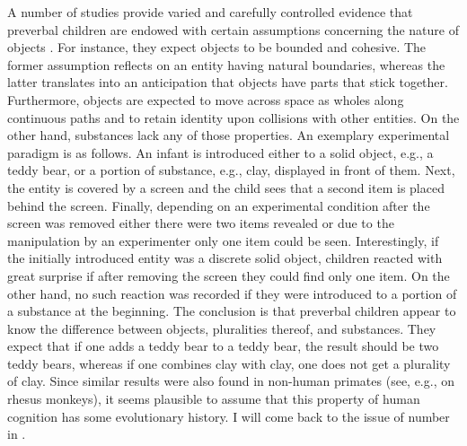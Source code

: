 A number of studies provide varied and carefully controlled evidence that preverbal children are endowed with certain assumptions concerning the nature of objects \citep[e.g.,][]{carey1985conceptual,spelke1990principles,soja_carey_spelke1991ontological,carey_spelke1996science}. For instance, they expect objects to be bounded and cohesive. The former assumption reflects on an entity having natural boundaries, whereas the latter translates into an anticipation that objects have parts that stick together. Furthermore, objects are expected to move across space as wholes along continuous paths and to retain identity upon collisions with other entities. On the other hand, substances lack any of those properties. An exemplary experimental paradigm is as follows. An infant is introduced either to a solid object, e.g., a teddy bear, or a portion of substance, e.g., clay, displayed in front of them. Next, the entity is covered by a screen and the child sees that a second item is placed behind the screen. Finally, depending on an experimental condition after the screen was removed either there were two items revealed or due to the manipulation by an experimenter only one item could be seen. Interestingly, if the initially introduced entity was a discrete solid object, children reacted with great surprise if after removing the screen they could find only one item. On the other hand, no such reaction was recorded if they were introduced to a portion of a substance at the beginning. The conclusion is that preverbal children appear to know the difference between objects, pluralities thereof, and substances. They expect that if one adds a teddy bear to a teddy bear, the result should be two teddy bears, whereas if one combines clay with clay, one does not get a plurality of clay. Since similar results were also found in non-human primates (see, e.g., \citealt{hauser_carey2003spontaneous,hauser_spaulding2006wild} on rhesus monkeys), it seems plausible to assume that this property of human cognition has some evolutionary history. I will come back to the issue of number in .

